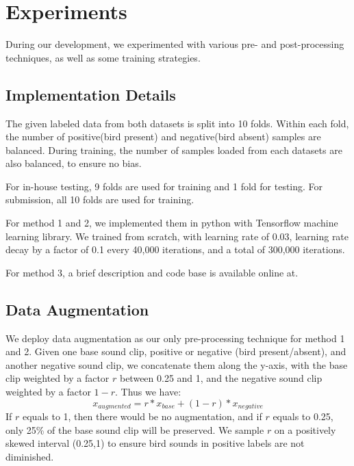 \documentclass[10pt,twocolumn,letterpaper]{article}
\begin{document}
\section{Experiments}

During our development, we experimented with various pre- and
post-processing techniques, as well as some training strategies.

\subsection{Implementation Details}

The given labeled data from both datasets is split into 10 folds. Within
each fold, the number of positive(bird present) and negative(bird absent)
samples are balanced. During training, the number of samples loaded from
each datasets are also balanced, to ensure no bias.

For in-house testing, 9 folds are used for training and 1 fold for testing.
For submission, all 10 folds are used for training.

For method 1 and 2, we implemented them in python with Tensorflow machine
learning library. We trained from scratch, with learning rate of 0.03,
learning rate decay by a factor of 0.1 every 40,000 iterations, and a total
of 300,000 iterations.

For method 3, a brief description and code base is available online
at\cite{winning_blog}.


\subsection{Data Augmentation}

We deploy data augmentation as our only pre-processing technique for method
1 and 2. Given one base sound clip, positive or negative (bird
present/absent), and another negative sound clip, we concatenate them along
the y-axis, with the base clip weighted by a factor \(r\) between 0.25 and
1, and the negative sound clip weighted by a factor \(1-r\). Thus we have:
\begin{equation}
	x_{augmented}=r*x_{base} + (1-r)*x_{negative}
\end{equation}
If \(r\) equals to 1, then there would be no augmentation, and if \(r\)
equals to 0.25, only 25\% of the base sound clip will be preserved. We
sample \(r\) on a positively skewed interval (0.25,1) to ensure bird sounds
in positive labels are not diminished.
\end{document}
